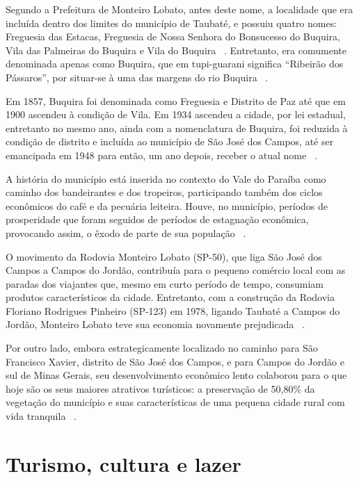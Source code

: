 Segundo a Prefeitura de Monteiro Lobato, antes deste nome, a localidade que era incluída dentro dos limites do município de Taubaté, e possuiu quatro nomes: Freguesia das Estacas, Freguesia de Nossa Senhora do Bonsucesso do Buquira, Vila das Palmeiras do Buquira e Vila do Buquira ~\cite{MonteiroLobatoSite}. Entretanto, era comumente denominada apenas como Buquira, que em tupi-guarani significa “Ribeirão dos Pássaros”, por situar-se à uma das margens do rio Buquira ~\cite{IBGE2010}.

Em 1857, Buquira foi denominada como Freguesia e Distrito de Paz até que em 1900 ascendeu à condição de Vila. Em 1934 ascendeu a cidade, por lei estadual, entretanto no mesmo ano, ainda com a nomenclatura de Buquira, foi reduzida à condição de distrito e incluída ao município de São José dos Campos, até ser emancipada em 1948 para então, um ano depois, receber o atual nome ~\cite{MonteiroLobatoSite}.

A história do município está inserida no contexto do Vale do Paraíba como caminho dos bandeirantes e dos tropeiros, participando também dos ciclos econômicos do café e da pecuária leiteira. Houve, no município, períodos de prosperidade que foram seguidos de períodos de estagnação econômica, provocando assim, o êxodo de parte de sua população ~\cite{MonteiroLobato2014}.

O movimento da Rodovia Monteiro Lobato (SP-50), que liga São José dos Campos a Campos do Jordão, contribuía para o pequeno comércio local com as paradas dos viajantes que, mesmo em curto período de tempo, consumiam produtos característicos da cidade. Entretanto, com a construção da Rodovia Floriano Rodrigues Pinheiro (SP-123) em 1978, ligando Taubaté a Campos do Jordão, Monteiro Lobato teve sua economia novamente prejudicada ~\cite{MonteiroLobato2014}.

Por outro lado, embora estrategicamente localizado no caminho para São Francisco Xavier, distrito de São José dos Campos, e para Campos do Jordão e sul de Minas Gerais, seu desenvolvimento econômico lento colaborou para o que hoje são os seus maiores atrativos turísticos: a preservação de 50,80\% da vegetação do município e suas características de uma pequena cidade rural com vida tranquila ~\cite{MonteiroLobato2014}.

\section{Turismo, cultura e lazer}

